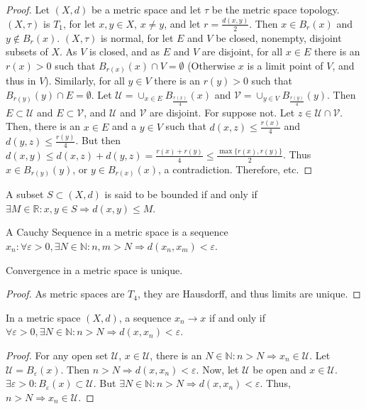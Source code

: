\documentclass[crop=false,class=book]{standalone}
\begin{document}
\begin{proof}
Let $(X,d)$ be a metric space and let $\tau$ be the metric space topology. $(X,\tau)$ is $T_1$, for let $x,y\in X$, $x\ne y$, and let $r= \frac{d(x,y)}{2}$. Then $x\in B_{r}(x)$ and $y\notin B_{r}(x)$. $(X,\tau)$ is normal, for let $E$ and $V$ be closed, nonempty, disjoint subsets of $X$. As $V$ is closed, and as $E$ and $V$ are disjoint, for all $x\in E$ there is an $r(x)>0$ such that $B_{r(x)}(x)\cap V = \emptyset$ (Otherwise $x$ is a limit point of $V$, and thus in $V$). Similarly, for all $y\in V$ there is an $r(y)>0$ such that $B_{r(y)}(y)\cap E = \emptyset$. Let $\mathcal{U} = \cup_{x\in E}B_{\frac{r(x)}{4}}(x)$ and $\mathcal{V} = \cup_{y\in V}B_{\frac{r(y)}{4}}(y)$. Then $E\subset \mathcal{U}$ and $E\subset \mathcal{V}$, and $\mathcal{U}$ and $\mathcal{V}$ are disjoint. For suppose not. Let $z\in \mathcal{U}\cap \mathcal{V}$. Then, there is an $x\in E$ and a $y\in V$ such that $d(x,z)\leq \frac{r(x)}{4}$ and $d(y,z)\leq \frac{r(y)}{4}$. But then $d(x,y) \leq d(x,z)+d(y,z) = \frac{r(x)+r(y)}{4} \leq \frac{\max\{r(x),r(y)\}}{2}$. Thus $x\in B_{r(y)}(y)$, or $y\in B_{r(x)}(x)$, a contradiction. Therefore, etc.
\end{proof}
\begin{definition}
A subset $S\subset (X,d)$ is said to be bounded if and only if $\exists M\in \mathbb{R}:x,y\in S\Rightarrow d(x,y)\leq M$.
\end{definition}
\begin{definition}
A Cauchy Sequence in a metric space is a sequence $x_n:\forall \varepsilon>0,\exists N\in \mathbb{N}:n,m>N\Rightarrow d(x_n,x_m)<\varepsilon$.
\end{definition}
\begin{corollary}
Convergence in a metric space is unique.
\end{corollary}
\begin{proof}
As metric spaces are $T_4$, they are Hausdorff, and thus limits are unique.
\end{proof}
\begin{theorem}
In a metric space $(X,d)$, a sequence $x_n\rightarrow x$ if and only if $\forall\varepsilon>0,\exists N\in \mathbb{N}:n>N\Rightarrow d(x,x_n)<\varepsilon$.
\end{theorem}
\begin{proof}
For any open set $\mathcal{U}$, $x\in \mathcal{U}$, there is an $N\in \mathbb{N}:n>N\Rightarrow x_n \in \mathcal{U}$. Let $\mathcal{U}=B_{\varepsilon}(x)$. Then $n>N\Rightarrow d(x,x_n)<\varepsilon$. Now, let $\mathcal{U}$ be open and $x\in \mathcal{U}$. $\exists\varepsilon>0:B_{\varepsilon}(x)\subset \mathcal{U}$. But $\exists N\in \mathbb{N}:n>N\Rightarrow d(x,x_n)<\varepsilon$. Thus, $n>N\Rightarrow x_n\in \mathcal{U}$.
\end{proof}
\end{document}
